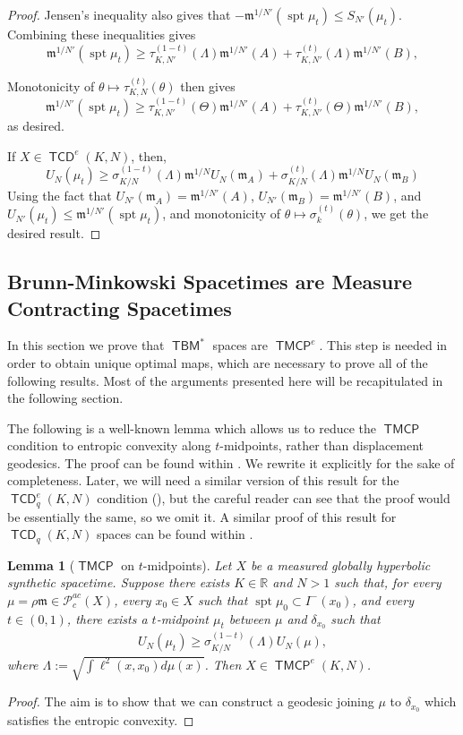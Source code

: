 \documentclass{article}
\newcommand{\R}{\mathbb{R}}
\newcommand{\m}{\mathfrak{m}}
\DeclareMathOperator{\spt}{spt}
\newcommand{\Pcal}{\mathcal{P}}
\DeclareMathOperator{\TCD}{\mathsf{TCD}}
\DeclareMathOperator{\TBM}{\mathsf{TBM}}
\DeclareMathOperator{\TMCP}{\mathsf{TMCP}}
\newtheorem{lemma}[theorem]{Lemma}
\theoremstyle{definition}
\begin{document}
{\begin{proof}
Jensen's inequality also gives that $-\m^{1/N'}(\spt\mu_t) \leq S_{N'}(\mu_t)$. Combining these inequalities gives 
\[\m^{1/N'}(\spt\mu_t) \geq \tau_{K,N'}^{(1-t)}(\Lambda)\m^{1/N'}(A)+ \tau_{K,N'}^{(t)}(\Lambda)\m^{1/N'}(B),\]

Monotonicity of $\theta\mapsto \tau_{K,N}^{(t)}(\theta)$ then gives 
\[\m^{1/N'}(\spt\mu_t) \geq \tau_{K,N'}^{(1-t)}(\Theta)\m^{1/N'}(A)+ \tau_{K,N'}^{(t)}(\Theta)\m^{1/N'}(B),\]
as desired.

If $X\in \TCD^e(K,N)$, then, 
\[U_{N}(\mu_t)\geq \sigma_{K/N}^{(1-t)}(\Lambda)\m^{1/N}U_{N}(\m_A)+\sigma_{K/N}^{(t)}(\Lambda)\m^{1/N}U_{N}(\m_B) \]
Using the fact that $U_{N'}(\m_A)= \m^{1/N'}(A)$, $U_{N'}(\m_B)= \m^{1/N'}(B)$, and $U_{N'}(\mu_t)\leq \m^{1/N'}(\spt\mu_t)$, and monotonicity of $\theta\mapsto\sigma_k^{(t)}(\theta)$, we get the desired result. 
\end{proof}



\subsection{Brunn-Minkowski Spacetimes are Measure Contracting Spacetimes} 

In this section we prove that $\TBM^*$ spaces are $\TMCP^e$. This step is needed in order to obtain unique optimal maps, which are necessary to prove all of the following results. Most of the arguments presented here will be recapitulated in the following section. 


The following is a well-known lemma which allows us to reduce the $\TMCP$ condition to entropic convexity along $t$-midpoints, rather than displacement geodesics. The proof can be found within \cite[Thm.\ 5.7]{Octet}. We rewrite it explicitly for the sake of completeness. Later, we will need a similar version of this result for the $\TCD_q^e(K,N)$ condition (), but the careful reader can see that the proof would be essentially the same, so we omit it. A similar proof of this result for $\TCD_q(K,N)$ spaces can be found within \cite[Thm.\ 3.33]{Braun}. 

\begin{lemma}[$\TMCP$ on $t$-midpoints]\label{midpointTMCP}
Let $X$ be a measured globally hyperbolic synthetic spacetime. Suppose there exists $K\in\R$ and $N>1$ such that, for every $\mu=\rho\m\in \Pcal_{c}^{ac}(X)$, every $x_0\in X$ such that $\spt\mu_0\subset I^-(x_0)$, and every $t\in (0,1)$, there exists a $t$-midpoint $\mu_{t}$ between $\mu$ and $\delta_{x_0}$ such that 
\begin{align}\label{midpointtmcp}
U_N(\mu_{t})\geq \sigma_{K/N}^{(1-t)}(\Lambda)U_N(\mu),
\end{align}
where $\Lambda:=\sqrt{\int \ell^2(x,x_0)d\mu(x)}$. Then $X\in \TMCP^e(K,N)$. 
\end{lemma}
\begin{proof}
The aim is to show that we can construct a geodesic joining $\mu$ to $\delta_{x_0}$ which satisfies the entropic convexity.  


\end{proof}}
\end{document}
